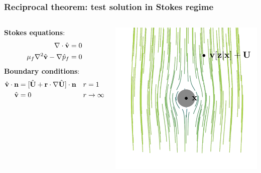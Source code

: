 \documentclass{sintefbeamer}
\begin{document}
\begin{frame}
  \frametitle{Reciprocal theorem: test solution in Stokes regime}

  \begin{columns}
    \textbf{Stokes equations}: 
    \begin{align*}
      \mathbf{\nabla}\cdot \hat{\textbf{v}} &= 0 \\
      \mu_f \mathbf{\nabla}^2 \hat{\textbf{v}}  
      - \mathbf{\nabla} \hat{p}_f 
      &= 0 
  \end{align*}
\textbf{Boundary conditions}:
\begin{align*}  
 \hat{\textbf{v}}\cdot \textbf{n} &= [\hat{ \textbf{U}} + \textbf{r}\cdot \mathbf{\nabla} \hat{\textbf{U}}]\cdot \textbf{n} 
  && 
  r = 1 \\
 \hat{\textbf{v}} &= 0 && r \to \infty\\
\end{align*}

\includegraphics[width = \textwidth]{image/Streamlines_trans.png}
\end{columns}


\end{frame}
\end{document}
